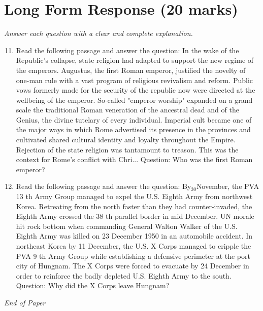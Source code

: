 \documentclass[12pt]{article}
\begin{document}
\section*{Long Form Response (20 marks)}
\textit{Answer each question with a clear and complete explanation.}
\begin{enumerate}[label=\arabic*.]
\setcounter{enumi}{10}
\item Read the following passage and answer the question: In the wake of the Republic's collapse, state religion had adapted to support the new regime of the emperors. Augustus, the first Roman emperor, justified the novelty of one-man rule with a vast program of religious revivalism and reform. Public vows formerly made for the security of the republic now were directed at the wellbeing of the emperor. So-called "emperor worship" expanded on a grand scale the traditional Roman veneration of the ancestral dead and of the Genius, the divine tutelary of every individual. Imperial cult became one of the major ways in which Rome advertised its presence in the provinces and cultivated shared cultural identity and loyalty throughout the Empire. Rejection of the state religion was tantamount to treason. This was the context for Rome's conflict with Chri... Question: Who was the first Roman emperor?
\item Read the following passage and answer the question: By$_{30}$November, the PVA 13 th Army Group managed to expel the U.S. Eighth Army from northwest Korea. Retreating from the north faster than they had counter-invaded, the Eighth Army crossed the 38 th parallel border in mid December. UN morale hit rock bottom when commanding General Walton Walker of the U.S. Eighth Army was killed on 23 December 1950 in an automobile accident. In northeast Korea by 11 December, the U.S. X Corps managed to cripple the PVA 9 th Army Group while establishing a defensive perimeter at the port city of Hungnam. The X Corps were forced to evacuate by 24 December in order to reinforce the badly depleted U.S. Eighth Army to the south. Question: Why did the X Corps leave Hungnam?
\end{enumerate}

\vfill
\noindent\textit{End of Paper}
\end{document}
